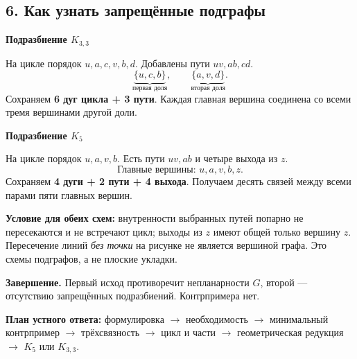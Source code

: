 \subsection*{6. Как узнать запрещённые подграфы}
\hypertarget{pk:step6}{}
\begin{minipage}[t]{.48\linewidth}
\centering
\textbf{Подразбиение \(K_{3,3}\)}\par\smallskip
{}
\par\raggedright
На цикле порядок \(u,a,c,v,b,d\).
Добавлены пути \(uv,ab,cd\).
\[
\underbrace{\{u,c,b\}}_{\text{первая доля}},\qquad
\underbrace{\{a,v,d\}}_{\text{вторая доля}}.
\]
Сохраняем \textbf{6 дуг цикла + 3 пути}.
Каждая главная вершина соединена со всеми тремя вершинами другой доли.
\end{minipage}\hfill
\begin{minipage}[t]{.48\linewidth}
\centering
\textbf{Подразбиение \(K_5\)}\par\smallskip
{}
\par\raggedright
На цикле порядок \(u,a,v,b\).
Есть пути \(uv,ab\) и четыре выхода из \(z\).
\[
\text{Главные вершины: }u,a,v,b,z.
\]
Сохраняем \textbf{4 дуги + 2 пути + 4 выхода}.
Получаем десять связей между всеми парами пяти главных вершин.
\end{minipage}

\medskip
\textbf{Условие для обеих схем:} внутренности выбранных путей попарно
не пересекаются и не встречают цикл; выходы из \(z\) имеют общей
только вершину \(z\). Пересечение линий \emph{без точки} на рисунке
не является вершиной графа. Это схемы подграфов, а не плоские укладки.

\begin{tcolorbox}[colback=cbBlueBack,colframe=cbBlue]
\textbf{Завершение.} Первый исход противоречит непланарности \(G\),
второй — отсутствию запрещённых подразбиений. Контрпримера нет.
\end{tcolorbox}
\textbf{План устного ответа:}
формулировка \(\to\) необходимость \(\to\) минимальный контрпример
\(\to\) трёхсвязность \(\to\) цикл и части \(\to\) геометрическая редукция
\(\to\) \(K_5\) или \(K_{3,3}\).
\endgroup
